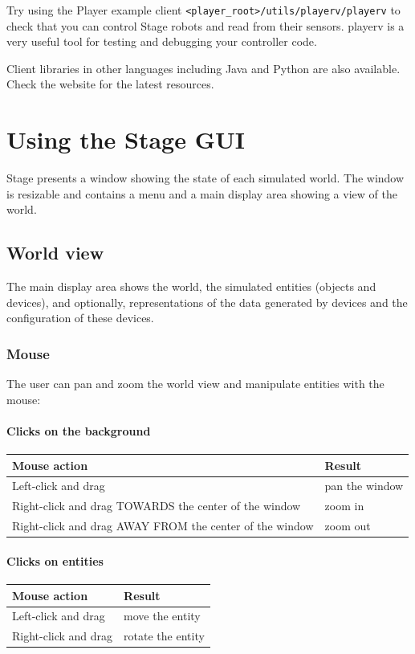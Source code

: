 \documentclass[letter,11pt,twoside]{report}
\begin{document}
Try using the Player example client
\verb+<player_root>/utils/playerv/playerv+ to check that you can control
Stage robots and read from their sensors. playerv is a very useful
tool for testing and debugging your controller code.

Client libraries in other languages including Java and Python are also
available. Check the website for the latest resources.

\chapter{Using the Stage GUI}

Stage presents a window showing the state of each simulated world. The
window is resizable and contains a menu and a main display area
showing a view of the world.

\section{World view}
The main display area shows the world, the simulated entities (objects
and devices), and optionally, representations of the data generated by
devices and the configuration of these devices.

\subsection{Mouse}
The user can pan and zoom the world view and manipulate entities with
the mouse:

\subsubsection*{Clicks on the background}

\begin{tabular}{|l|l|}
\hline Mouse action & Result\\\hline
Left-click and drag & pan the window\\
Right-click and drag TOWARDS the center of the window & zoom in\\
Right-click and drag AWAY FROM the center of the window & zoom out\\ 
\hline
\end{tabular}

\subsubsection*{Clicks on entities}
\begin{tabular}{|l|l|}
\hline Mouse action & Result\\\hline
Left-click and drag & move the entity\\
Right-click and drag & rotate the entity\\
\hline
\end{tabular}
\end{document}
